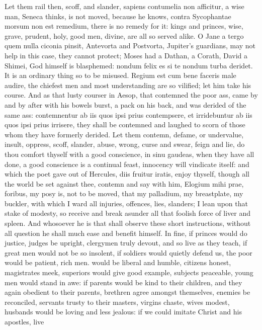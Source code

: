 {Let them rail then, scoff, and slander, sapiens contumelia non
afficitur, a wise man, Seneca thinks, is not moved, because he knows,
contra Sycophantae morsum non est remedium, there is no remedy for it:
kings and princes, wise, grave, prudent, holy, good men, divine, are
all so served alike. O Jane a tergo quem nulla ciconia pinsit,
Antevorta and Postvorta, Jupiter's guardians, may not help in this
case, they cannot protect; Moses had a Dathan, a Corath, David a
Shimei, God himself is blasphemed: nondum felix es si te nondum turba
deridet. It is an ordinary thing so to be misused. Regium est cum
bene faceris male audire, the chiefest men and most understanding are
so vilified; let him take his course. And as that lusty courser
in Aesop, that contemned the poor ass, came by and by after with his
bowels burst, a pack on his back, and was derided of the same ass:
contemnentur ab iis quos ipsi prius contempsere, et irridebuntur ab iis
quos ipsi prius irrisere, they shall be contemned and laughed to scorn
of those whom they have formerly derided. Let them contemn, defame, or
undervalue, insult, oppress, scoff, slander, abuse, wrong, curse and
swear, feign and lie, do thou comfort thyself with a good conscience,
in sinu gaudeas, when they have all done, a good conscience is a
continual feast, innocency will vindicate itself: and which the poet
gave out of Hercules, diis fruitur iratis, enjoy thyself, though all
the world be set against thee, contemn and say with him, Elogium mihi
prae, foribus, my posy is, not to be moved, that my palladium, my
breastplate, my buckler, with which I ward all injuries, offences,
lies, slanders; I lean upon that stake of modesty, so receive and break
asunder all that foolish force of liver and spleen. And whosoever he is
that shall observe these short instructions, without all question he
shall much ease and benefit himself.
In fine, if princes would do justice, judges be upright, clergymen
truly devout, and so live as they teach, if great men would not be so
insolent, if soldiers would quietly defend us, the poor would be
patient, rich men. would be liberal and humble, citizens honest,
magistrates meek, superiors would give good example, subjects
peaceable, young men would stand in awe: if parents would be kind to
their children, and they again obedient to their parents, brethren
agree amongst themselves, enemies be reconciled, servants trusty to
their masters, virgins chaste, wives modest, husbands would be loving
and less jealous: if we could imitate Christ and his apostles, live
}
